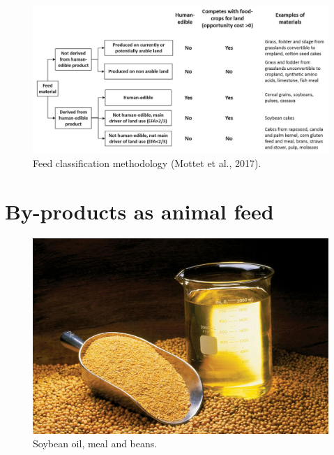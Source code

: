 \documentclass[]{book}
\begin{document}
\begin{figure}

{\centering \includegraphics[width=1\linewidth]{figures/feed-classification} 

}

\caption{Feed classification methodology (Mottet et al., 2017).}\label{fig:feed-classification}
\end{figure}

\hypertarget{by-products-as-animal-feed}{%
\section{By-products as animal feed}\label{by-products-as-animal-feed}}

\begin{figure}

{\centering \includegraphics[width=1\linewidth]{figures/sbm} 

}

\caption{Soybean oil, meal and beans.}\label{fig:sbm}
\end{figure}
\end{document}
